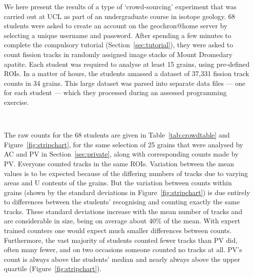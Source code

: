 \documentclass[gchron, manuscript]{copernicus}
\begin{document}
We here present the results of a type of `crowd-sourcing' experiment
that was carried out at UCL as part of an undergraduate course in
isotope geology. 68 students were asked to create an account on the
geochron@home server by selecting a unique username and
password. After spending a few minutes to complete the compulsory
tutorial (Section~\ref{sec:tutorial}), they were asked to count
fission tracks in randomly assigned image stacks of Mount Dromedary
apatite. Each student was required to analyse at least 15 grains,
using pre-defined ROIs. In a matter of hours, the students amassed a
dataset of 37,331 fission track counts in 34 grains.  This large
dataset was parsed into separate data files --- one for each student
--- which they processed during an assessed programming
exercise.\medskip

\begin{small}
  \\
\end{small}
\label{tab:crowdtable}

The raw counts for the 68 students are given in
Table~\ref{tab:crowdtable} and Figure~\ref{fig:stripchart}, for the
same selection of 25 grains that were analysed by AC and PV in
Section~\ref{sec:private}, along with corresponding counts made by
PV. Everyone counted tracks in the same ROIs. Variation between the
mean values is to be expected because of the differing numbers of
tracks due to varying areas and U contents of the grains. But the
variation between counts within grains (shown by the standard
deviations in Figure~\ref{fig:stripchart}) is due entirely to
differences between the students' recognising and counting exactly the
same tracks. These standard deviations increase with the mean number
of tracks and are considerable in size, being on average about 40\% of
the mean. With expert trained counters one would expect much smaller
differences between counts.  Furthermore, the vast majority of
students counted fewer tracks than PV did, often many fewer, and on
two occasions someone counted no tracks at all. PV's count is always
above the students' median and nearly always above the upper quartile
(Figure~\ref{fig:stripchart}).\medskip
\end{document}
